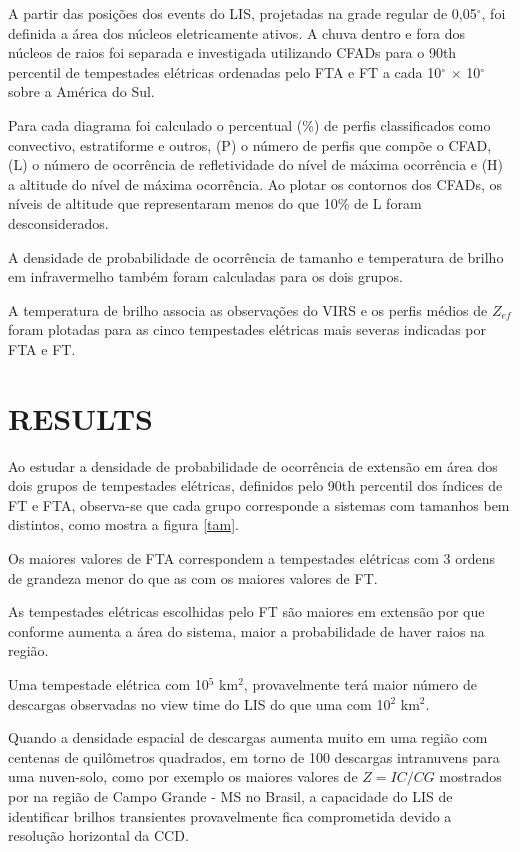 \documentclass[preprint,authoryear,3p]{elsarticle}
\begin{document}
\begin{multicols}{2}

A partir das posições dos events do LIS, projetadas na grade regular de 0,05$^{\circ}$, foi definida a área dos núcleos eletricamente ativos. A chuva dentro e fora dos núcleos de raios foi separada e investigada utilizando CFADs para o 90th percentil de tempestades elétricas ordenadas pelo FTA e FT a cada 10$^{\circ}$  $\times$ 10$^{\circ}$ sobre a América do Sul. 

Para cada diagrama foi calculado o percentual (\%) de perfis classificados como convectivo, estratiforme e outros, (P) o número de perfis que compõe o CFAD, (L) o número de ocorrência de refletividade do nível de máxima ocorrência e (H) a altitude do nível de máxima ocorrência. Ao plotar os contornos dos CFADs, os níveis de altitude que representaram menos do que 10\% de L foram desconsiderados.

A densidade de probabilidade de ocorrência de tamanho e temperatura de brilho em infravermelho também foram calculadas para os dois grupos. 

A temperatura de brilho associa as observações do VIRS e os perfis médios de $Z_{ef}$ foram plotadas para as cinco tempestades elétricas mais severas indicadas por FTA e FT.

\section{RESULTS}

Ao estudar a densidade de probabilidade de ocorrência de extensão em área dos dois grupos de tempestades elétricas, definidos pelo 90th percentil dos índices de FT e FTA, observa-se que cada grupo corresponde a sistemas com tamanhos bem distintos, como mostra a figura \ref{tam}.  

Os maiores valores de FTA correspondem a tempestades elétricas com 3 ordens de grandeza menor do que as com os maiores valores de FT.

As tempestades elétricas escolhidas pelo FT são maiores em extensão por que conforme aumenta a área do sistema, maior a probabilidade de haver raios na região.

Uma tempestade elétrica com 10$^5$ km$^2$, provavelmente terá maior número de descargas observadas no view time do LIS do que uma com 10$^2$ km$^2$. 

Quando a densidade espacial de descargas aumenta muito em uma região com centenas de quilômetros quadrados, em torno de 100 descargas intranuvens para uma nuven-solo, como por exemplo os maiores valores de $Z=IC/CG$ mostrados por \cite{evandro2009} na região de Campo Grande - MS no Brasil, a capacidade do LIS de identificar brilhos transientes provavelmente fica comprometida devido a resolução horizontal da CCD.


\end{multicols}
\end{document}
